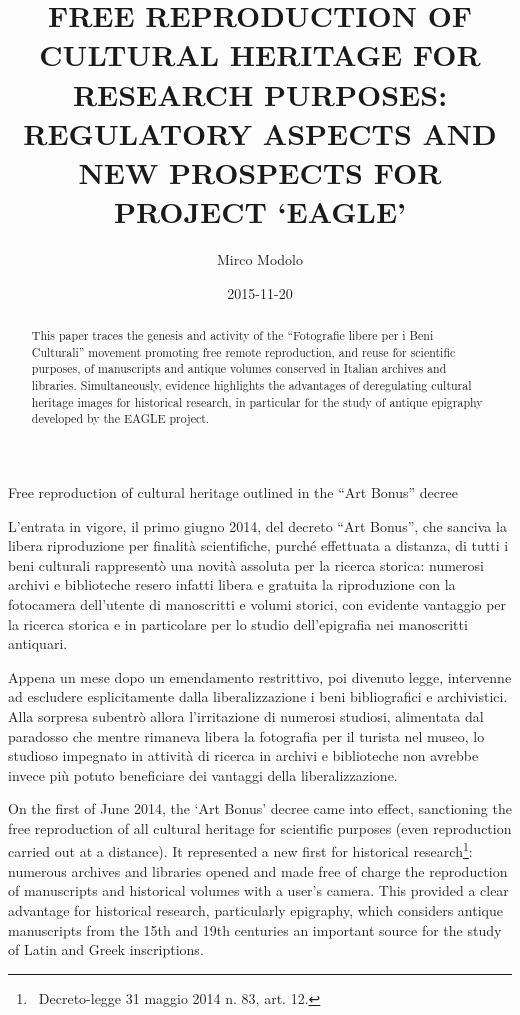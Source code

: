 \documentclass[amsthm,ebook]{saparticle}
\title{FREE REPRODUCTION OF CULTURAL HERITAGE FOR RESEARCH PURPOSES: REGULATORY ASPECTS AND NEW PROSPECTS FOR PROJECT `EAGLE'}
\author[free]{Mirco Modolo\corref{first}}
\date{2015-11-20}
\begin{document}
\maketitle
\begin{abstract}
This paper traces the genesis and activity of the “Fotografie libere per i Beni Culturali” movement promoting free
remote reproduction, and reuse for scientific purposes, of manuscripts and antique volumes conserved in Italian
archives and libraries. Simultaneously, evidence highlights the advantages of deregulating cultural heritage images for
historical research, in particular for the study of antique epigraphy developed by the EAGLE project.
\end{abstract}

Free reproduction of cultural heritage outlined in the “Art Bonus” decree

L’entrata in vigore, il primo giugno 2014, del decreto “Art Bonus”, che sanciva la libera riproduzione per finalità
scientifiche, purché effettuata a distanza, di tutti i beni culturali rappresentò una novità assoluta per la ricerca
storica: numerosi archivi e biblioteche resero infatti libera e gratuita la riproduzione con la fotocamera dell’utente
di manoscritti e volumi storici, con evidente vantaggio per la ricerca storica e in particolare per lo studio
dell’epigrafia nei manoscritti antiquari. 

Appena un mese dopo un emendamento restrittivo, poi divenuto legge, intervenne ad escludere esplicitamente dalla
liberalizzazione i beni bibliografici e archivistici. Alla sorpresa subentrò allora l’irritazione di numerosi studiosi,
alimentata dal paradosso che mentre rimaneva libera la fotografia per il turista nel museo, lo studioso impegnato in
attività di ricerca in archivi e biblioteche non avrebbe invece più potuto beneficiare dei vantaggi della
liberalizzazione. 

On the first of June 2014, the ‘Art Bonus’ decree came into effect, sanctioning the free reproduction of all cultural
heritage for scientific purposes (even reproduction carried out at a distance). It represented a new first for
historical research\footnote{\ Decreto-legge 31 maggio 2014 n. 83, art. 12.}: numerous archives and libraries opened
and made free of charge the reproduction of manuscripts and historical volumes with a user’s camera. This provided a
clear advantage for historical research, particularly epigraphy, which considers antique manuscripts from the 15th and
19th centuries an important source for the study of Latin and Greek inscriptions. 
\end{document}
